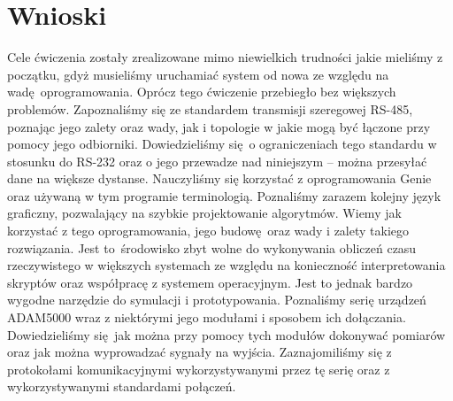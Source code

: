 \documentclass[a4paper, 12pt]{article}
\begin{document}
	\section{Wnioski}
		Cele ćwiczenia zostały zrealizowane mimo niewielkich trudności jakie mieliśmy z początku, gdyż musieliśmy uruchamiać system od nowa ze względu na wadę oprogramowania. Oprócz tego ćwiczenie przebiegło bez większych problemów.
		\newline
		\newline
		Zapoznaliśmy się ze standardem transmisji szeregowej RS-485, poznając jego zalety oraz wady, jak i topologie w jakie mogą być łączone przy pomocy jego odbiorniki. Dowiedzieliśmy się \linebreak o ograniczeniach tego standardu w stosunku do RS-232 oraz o jego przewadze nad niniejszym -- można przesyłać dane na większe dystanse.
		\newline 
		\newline
		Nauczyliśmy się korzystać z oprogramowania Genie oraz używaną w tym programie terminologią. Poznaliśmy zarazem kolejny język graficzny, pozwalający na szybkie projektowanie algorytmów. Wiemy jak korzystać z tego oprogramowania, jego budowę oraz wady i zalety takiego rozwiązania. Jest to środowisko zbyt wolne do wykonywania obliczeń czasu rzeczywistego w większych systemach ze względu na konieczność interpretowania skryptów oraz współpracę z systemem operacyjnym. Jest to jednak bardzo wygodne narzędzie do symulacji i prototypowania.
		\newline
		\newline
		Poznaliśmy serię urządzeń ADAM5000 wraz z niektórymi jego modułami i sposobem ich dołączania. Dowiedzieliśmy się jak można przy pomocy tych modułów dokonywać pomiarów oraz jak można wyprowadzać sygnały na wyjścia. Zaznajomiliśmy się z protokołami komunikacyjnymi wykorzystywanymi przez tę serię oraz z wykorzystywanymi standardami połączeń. 
\end{document}
